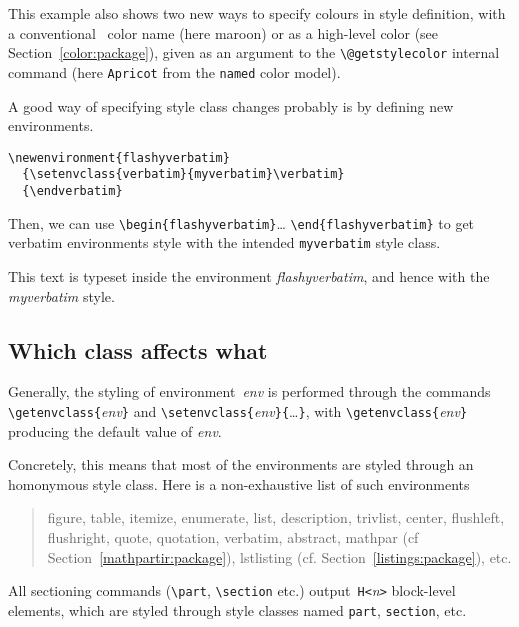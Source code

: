 This example also shows two new ways to specify colours in style
definition, with a
conventional \html~color name (here {\ifhevea\maroon\fi maroon}) or as
a high-level color (see Section~\ref{color:package}), given as an argument to
the \verb+\@getstylecolor+ internal command
(here \colorbox{abricot}{\texttt{Apricot}} from the \texttt{named} color model).

A good way of specifying style class changes probably is by defining
new environments.
\begin{verbatim}
\newenvironment{flashyverbatim}
  {\setenvclass{verbatim}{myverbatim}\verbatim}
  {\endverbatim}
\end{verbatim}
\newenvironment{flashyverbatim}
  {\setenvclass{verbatim}{myverbatim}\verbatim}
  {\endverbatim}%
Then, we can use \verb+\begin{flashyverbatim}+\ldots{}
\verb+\end{flashyverbatim}+ to get verbatim environments style with
the intended \texttt{myverbatim} style class.
\begin{htmlonly}\begin{flashyverbatim}
This text is typeset inside the environment
\emph{flashyverbatim}, and hence with the \emph{myverbatim}
style.
\end{flashyverbatim}
\end{htmlonly}

\subsection{Which class affects\label{whatclass} what}

Generally, the styling of environment~\textit{env} is performed through
the commands
\verb+\getenvclass{+\textit{env}\verb+}+
and \verb+\setenvclass{+\textit{env}\verb+}{+\ldots\verb+}+,
with \verb+\getenvclass{+\textit{env}\verb+}+ producing the
default value of \textit{env}.

Concretely, this means that most of the environments are styled through
an homonymous style class. Here is a non-exhaustive list of such
environments
\begin{quote}
figure, table, itemize, enumerate, list, description, 
trivlist, center, flushleft, flushright, quote,
quotation, verbatim, abstract, mathpar (cf
Section~\ref{mathpartir:package}), lstlisting
(cf. Section~\ref{listings:package}), etc.
\end{quote}

All sectioning commands (\verb+\part+, \verb+\section+ etc.)
output~\verb+H<+\textit{n}\verb+>+ block-level  elements, which are styled
through style classes named \texttt{part}, \texttt{section}, etc.

